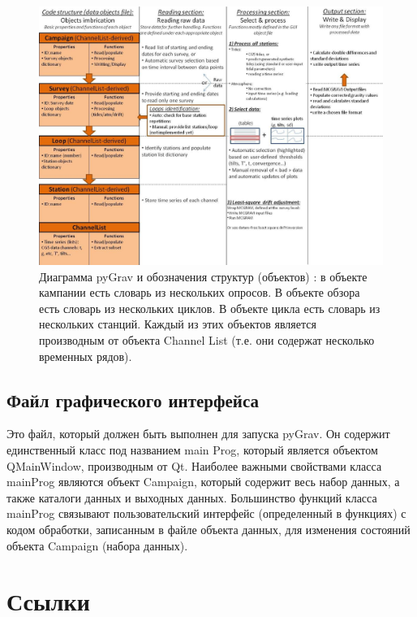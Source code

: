 \begin{figure}
    \includegraphics[width=\textwidth]{figures/pygrav_chart_and_structures_imbrications}
    \caption{Диаграмма pyGrav и обозначения структур (объектов) : в объекте
    кампании есть словарь из нескольких опросов. В объекте обзора есть словарь
    из нескольких циклов. В объекте цикла есть словарь из нескольких станций.
    Каждый из этих объектов является производным от объекта Channel List (т.е.
    они содержат несколько временных рядов).}
    \label{fig:pygrav_chart_and_structures_imbrications}
\end{figure}

\subsection[Файл графического интерфейса]{Файл графического интерфейса}
\label{subsec:gui_file}

Это файл, который должен быть выполнен для запуска pyGrav. Он содержит
единственный класс под названием main Prog, который является объектом
QMainWindow, производным от Qt. Наиболее важными свойствами класса mainProg
являются объект Campaign, который содержит весь набор данных, а также каталоги
данных и выходных данных. Большинство функций класса mainProg связывают
пользовательский интерфейс (определенный в функциях) с кодом обработки,
записанным в файле объекта данных, для изменения состояний объекта Campaign
(набора данных).

\section*{Ссылки}

